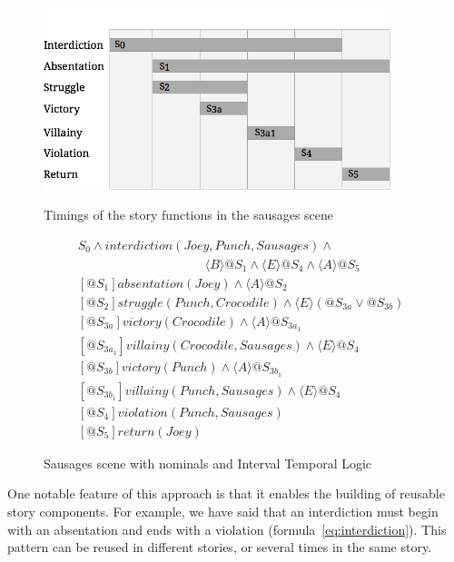 \documentclass[11pt]{report}
\begin{document}
\begin{figure}[!t]
  \centering
    \centerline{\includegraphics[width=0.9\textwidth]{durations.png}}
  \caption{Timings of the story functions in the sausages scene}\label{fig:durations}
\begin{align}
  &S_{0} \land \mathit{interdiction(Joey, Punch, Sausages)} \land\nonumber\\
  &\qquad\qquad\qquad\qquad\qquad\langle B \rangle @S_{1} \land \langle E \rangle @S_{4} \land \langle A \rangle @S_{5}\label{eq:interdiction}\\
  &[@S_{1}] \mathit{absentation(Joey)} \land \langle A \rangle @S_{2}\label{eq:absentation}\\
  &[@S_{2}] \mathit{struggle(Punch, Crocodile)} \land \langle E \rangle (@S_{3a} \lor @S_{3b})\label{eq:struggle}\\
  &[@S_{3a}] \mathit{victory(Crocodile)} \land \langle A \rangle @S_{3a_1}\\
  &[@S_{3a_1}] \mathit{villainy(Crocodile, Sausages)} \land \langle E \rangle @S_{4}\\
  &[@S_{3b}] \mathit{victory(Punch)} \land \langle A \rangle @S_{3b_1}\\
  &[@S_{3b_1}] \mathit{villainy(Punch, Sausages)} \land \langle E \rangle @S_{4}\\
  &[@S_{4}] \mathit{violation(Punch, Sausages)}\\
  &[@S_{5}] \mathit{return(Joey)}
\end{align}
\caption{Sausages scene with nominals and Interval Temporal Logic}\label{fig:situations}
\end{figure}

One notable feature of this approach is that it enables the building of reusable story components. For example, we have said that an interdiction must begin with an absentation and ends with a violation (formula~\ref{eq:interdiction}). This pattern can be reused in different stories, or several times in the same story.
\end{document}
